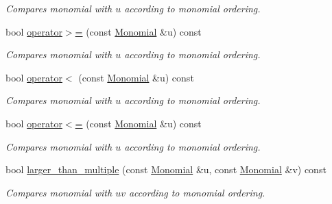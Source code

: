 \begin{Indent}
\begin{DoxyCompactItemize}
\begin{DoxyCompactList}\small\item\em Compares monomial with $u$ according to monomial ordering. \end{DoxyCompactList}\item 
\mbox{\label{group__polygroup_ae6607ae89a4e6ee332b3a69266d133d9}} 
bool \hyperlink{group__polygroup_ae6607ae89a4e6ee332b3a69266d133d9}{operator$>$=} (const \hyperlink{group__polygroup_class_monomial}{Monomial} \&u) const
\begin{DoxyCompactList}\small\item\em Compares monomial with $u$ according to monomial ordering. \end{DoxyCompactList}\item 
\mbox{\label{group__polygroup_a6b3223572db10a2231049f449232b19e}} 
bool \hyperlink{group__polygroup_a6b3223572db10a2231049f449232b19e}{operator$<$} (const \hyperlink{group__polygroup_class_monomial}{Monomial} \&u) const
\begin{DoxyCompactList}\small\item\em Compares monomial with $u$ according to monomial ordering. \end{DoxyCompactList}\item 
\mbox{\label{group__polygroup_a89124b9c5534435a9c044ac54705b8fc}} 
bool \hyperlink{group__polygroup_a89124b9c5534435a9c044ac54705b8fc}{operator$<$=} (const \hyperlink{group__polygroup_class_monomial}{Monomial} \&u) const
\begin{DoxyCompactList}\small\item\em Compares monomial with $u$ according to monomial ordering. \end{DoxyCompactList}\item 
\mbox{\label{group__polygroup_a1cac303db5d3cc66247137172cf84145}} 
bool \hyperlink{group__polygroup_a1cac303db5d3cc66247137172cf84145}{larger\+\_\+than\+\_\+multiple} (const \hyperlink{group__polygroup_class_monomial}{Monomial} \&u, const \hyperlink{group__polygroup_class_monomial}{Monomial} \&v) const
\begin{DoxyCompactList}\small\item\em Compares monomial with $uv$ according to monomial ordering. \end{DoxyCompactList}\item 

\end{DoxyCompactItemize}
\end{Indent}
